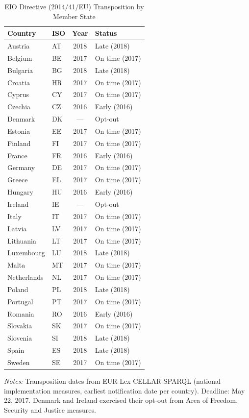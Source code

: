 \begin{table}[t]
\centering
\caption{EIO Directive (2014/41/EU) Transposition by Member State}
\label{tab:transposition}
\begin{tabular}{llcl}
\hline\hline
Country & ISO & Year & Status \\
\hline
Austria & AT & 2018 & Late (2018) \\
Belgium & BE & 2017 & On time (2017) \\
Bulgaria & BG & 2018 & Late (2018) \\
Croatia & HR & 2017 & On time (2017) \\
Cyprus & CY & 2017 & On time (2017) \\
Czechia & CZ & 2016 & Early (2016) \\
Denmark & DK & --- & Opt-out \\
Estonia & EE & 2017 & On time (2017) \\
Finland & FI & 2017 & On time (2017) \\
France & FR & 2016 & Early (2016) \\
Germany & DE & 2017 & On time (2017) \\
Greece & EL & 2017 & On time (2017) \\
Hungary & HU & 2016 & Early (2016) \\
Ireland & IE & --- & Opt-out \\
Italy & IT & 2017 & On time (2017) \\
Latvia & LV & 2017 & On time (2017) \\
Lithuania & LT & 2017 & On time (2017) \\
Luxembourg & LU & 2018 & Late (2018) \\
Malta & MT & 2017 & On time (2017) \\
Netherlands & NL & 2017 & On time (2017) \\
Poland & PL & 2018 & Late (2018) \\
Portugal & PT & 2017 & On time (2017) \\
Romania & RO & 2016 & Early (2016) \\
Slovakia & SK & 2017 & On time (2017) \\
Slovenia & SI & 2018 & Late (2018) \\
Spain & ES & 2018 & Late (2018) \\
Sweden & SE & 2017 & On time (2017) \\
\hline\hline
\end{tabular}
\begin{tablenotes}
\item \textit{Notes:} Transposition dates from EUR-Lex CELLAR SPARQL (national implementation measures, earliest notification date per country). Deadline: May 22, 2017. Denmark and Ireland exercised their opt-out from Area of Freedom, Security and Justice measures.
\end{tablenotes}
\end{table}
